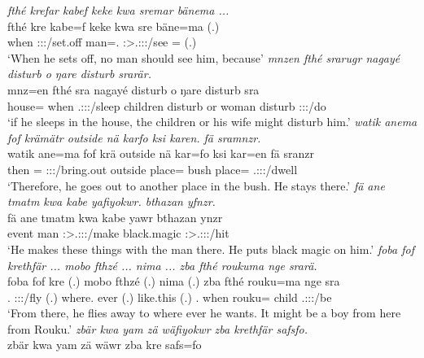 \begin{exe}
	\emph{fthé krefar kabef keke kwa sremar bänema ...}\\
	\gll fthé kre kabe=f keke kwa sre bäne=ma (.)\\
	when \Stsg:\Sbj:\Irr:\Pfv/set.off man=\Erg.{\Sg} {\Neg} {\Fut} \Stsg:\Sbj>\Tsg.\Masc:\Obj:\Irr:\Pfv/see \Recog={\Char} (.)\\
	\trans `When he sets off, no man should see him, because'
	\emph{mnzen fthé srarugr nagayé disturb o ŋare disturb srarär.}\\
	\gll mnz=en fthé sra nagayé disturb o ŋare disturb sra\\
	house={\Loc} when \Tsg.\Masc:\Sbj:\Irr:\Ipfv/sleep children disturb or woman disturb \Stsg:\Sbj:\Nonpast:\Ipfv/do\\
	\trans `if he sleeps in the house, the children or his wife might disturb him.'
	\emph{watik anema fof krämätr outside nä karfo ksi karen. fä sramnzr.}\\
	\gll watik ane=ma fof krä outside nä kar=fo ksi kar=en fä sranzr\\
	then \Dem={\Char} {\Emph} \Stsg:\Sbj:\Irr:\Pfv/bring.out outside {\Indf} place={\All} bush place={\All} {\Dist} \Tsg.\Masc:\Sbj:\Irr:\Ipfv/dwell\\
	\trans `Therefore, he goes out to another place in the bush. He stays there.'
	\emph{fä ane tmatm kwa kabe yafiyokwr. bthazan yfnzr.}\\
	\gll fä ane tmatm kwa kabe yawr bthazan ynzr\\
	{\Dist} {\Dem} event {\Fut} man \Stsg:\Sbj>\Tsg.\Masc:\Obj:\Nonpast:\Ipfv/make black.magic \Stsg:\Sbj>\Tsg.\Masc:\Obj:\Nonpast:\Ipfv/hit\\
	\trans `He makes these things with the man there. He puts black magic on him.'
	\emph{foba fof krethfär ... mobo fthzé ... nima ... zba fthé roukuma nge srarä.}\\
	\gll foba fof kre (.) mobo fthzé (.) nima (.) zba fthé rouku=ma nge sra\\
	\Dist.{\Abl} {\Emph} \Stsg:\Sbj:\Irr:\Ipfv/fly (.) where.{\All} ever (.) like.this (.) \Prox.{\Abl} when rouku={\Char} child \Tsg.\Masc:\Sbj:\Irr:\Ipfv/be\\
	\trans `From there, he flies away to where ever he wants. It might be a boy from here from Rouku.'
	\emph{zbär kwa yam zä wäfiyokwr zba krethfär safsfo.}\\
	\gll zbär kwa yam zä wäwr zba kre safs=fo\\

\end{exe}
